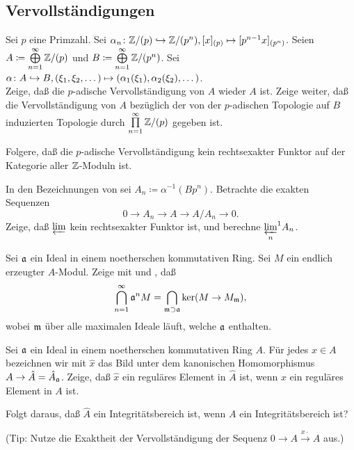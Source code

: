 \subsection{Vervollständigungen}

\begin{exercise}
	\label{exer:compl_not_right_exact}
	Sei \(p\) eine Primzahl. Sei \(\alpha_n\colon \mathbb Z/(p) \hookrightarrow \mathbb Z/(p^n), [x]_{(p)} \mapsto [p^{n - 1} x]_{(p^n)}\).
	Seien \(A \coloneqq \bigoplus\limits_{n = 1}^\infty \mathbb Z/(p)\) und \(B \coloneqq \bigoplus\limits_{n = 1}^\infty \mathbb Z/(p^n)\).
	Sei \(\alpha\colon A \hookrightarrow B, (\xi_1, \xi_2, \dotsc) \mapsto (\alpha_1(\xi_1), \alpha_2(\xi_2), \dotsc)\).
	\\
	Zeige, daß die \(p\)-adische Vervollständigung von \(A\) wieder \(A\) ist.
	Zeige weiter, daß die Vervollständigung von \(A\) bezüglich der von der \(p\)-adischen Topologie auf \(B\) induzierten Topologie
	durch \(\prod\limits_{n = 1}^\infty \mathbb Z/(p)\) gegeben ist.
	
	Folgere, daß die \(p\)-adische Vervollständigung kein rechtsexakter Funktor auf der Kategorie aller \(\mathbb Z\)-Moduln ist.
\end{exercise}

\begin{exercise}
	In den Bezeichnungen von  sei \(A_n \coloneqq \alpha^{-1} (B p^n)\). Betrachte die
	exakten Sequenzen
	\[
		0 \to A_n \to A \to A/A_n \to 0.
	\]
	Zeige, daß \(\varprojlim\) kein rechtsexakter Funktor ist, und berechne \({\varprojlim\limits_n}^1 A_n\).
\end{exercise}

\begin{exercise}
	Sei \(\mathfrak{a}\) ein Ideal in einem noetherschen kommutativen Ring. Sei \(M\) ein endlich erzeugter \(A\)-Modul.
	Zeige mit  und , daß
	\[
		\bigcap\limits_{n = 1}^\infty \mathfrak{a}^n M = \bigcap\limits_{\mathfrak{m} \supset \mathfrak{a}} \ker(M \to M_{\mathfrak{m}}),
	\]
	wobei \(\mathfrak{m}\) über alle maximalen Ideale läuft, welche \(\mathfrak{a}\) enthalten.
\end{exercise}

\begin{exercise}
	Sei \(\mathfrak{a}\) ein Ideal in einem noetherschen kommutativen Ring \(A\). Für jedes \(x \in A\) bezeichnen wir mit
	\(\hat x\) das Bild unter dem kanonischen Homomorphismus \(A \to \hat A = \hat A_{\mathfrak{a}}\). Zeige, daß \(\hat x\) ein
	reguläres Element in \(\hat A\) ist, wenn \(x\) ein reguläres Element in \(A\) ist.
	
	Folgt daraus, daß \(\hat A\) ein Integritätsbereich ist, wenn \(A\) ein Integritätsbereich ist?
	
	(Tip: Nutze die Exaktheit der Vervollständigung der Sequenz \(0 \to A \xrightarrow{x \cdot} A\) aus.)
\end{exercise}

